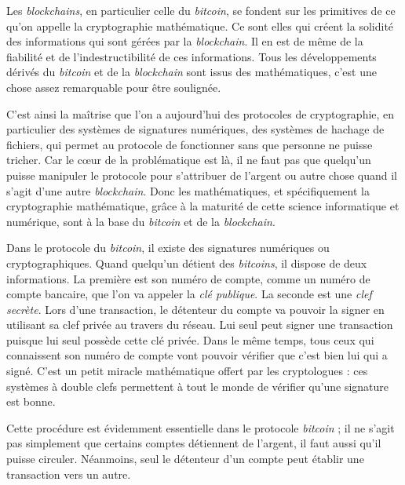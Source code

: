 
Les \textit{blockchains}, en particulier celle du \textit{bitcoin}, se fondent sur les primitives de ce qu'on appelle la cryptographie mathématique. Ce sont elles qui créent la solidité des informations qui sont gérées par la \textit{blockchain}. Il en est de même de la fiabilité et de l'indestructibilité de ces informations. Tous les développements dérivés du \textit{bitcoin} et de la \textit{blockchain} sont issus des mathématiques, c'est une chose assez remarquable pour être soulignée. 

C'est ainsi la maîtrise que l'on a aujourd'hui des protocoles de cryptographie, en particulier des systèmes de signatures numériques, des systèmes de hachage de fichiers, qui permet au protocole de fonctionner sans que personne ne puisse tricher. Car le cœur de la problématique est là, il ne faut pas que quelqu'un puisse manipuler le protocole pour s'attribuer de l'argent ou autre chose quand il s'agit d'une autre \textit{blockchain}. Donc les mathématiques, et spécifiquement la cryptographie mathématique, grâce à la maturité de cette science informatique et numérique, sont à la base du \textit{bitcoin} et de la \textit{blockchain}.  


Dans le protocole du \textit{bitcoin}, il existe des signatures numériques ou cryptographiques. Quand quelqu'un détient des \textit{bitcoins}, il dispose de deux informations. La première est son numéro de compte, comme un numéro de compte bancaire, que l'on va appeler la \emph{clé publique}. La seconde est une \emph{clef secrète}. Lors d'une transaction, le détenteur du compte va pouvoir la signer en utilisant sa clef privée au travers du réseau. Lui seul peut signer une transaction puisque lui seul possède cette clé privée. Dans le même temps, tous ceux qui 
connaissent son numéro de compte vont pouvoir vérifier que c'est bien lui qui a signé. C'est un petit miracle mathématique offert par les cryptologues : ces systèmes à double clefs permettent à tout le monde de vérifier qu'une signature est bonne.

%
Cette procédure est évidemment essentielle dans le protocole \textit{bitcoin} ; il ne s'agit pas simplement que certains comptes détiennent de l'argent, il faut aussi qu'il puisse circuler. Néanmoins, seul le détenteur d'un compte peut établir une transaction vers un autre.

